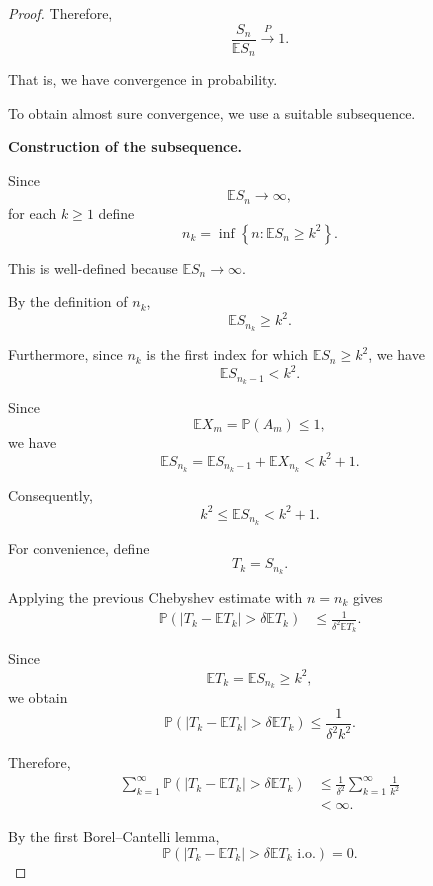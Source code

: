 \begin{proof}
Therefore,
\[
    \frac{S_n}{\mathbb E S_n}
    \xrightarrow{P}1.
\]

That is, we have convergence in probability.

To obtain almost sure convergence, we use a suitable subsequence.

\medskip

\noindent
\textbf{Construction of the subsequence.}

Since
\[
    \mathbb E S_n\longrightarrow\infty,
\]
for each $k\geq1$ define
\[
    n_k
    =
    \inf\left\{
        n:\mathbb E S_n\geq k^2
    \right\}.
\]

This is well-defined because $\mathbb E S_n\to\infty$.

By the definition of $n_k$,
\[
    \mathbb E S_{n_k}\geq k^2.
\]

Furthermore, since $n_k$ is the first index for which
$\mathbb E S_n\geq k^2$, we have
\[
    \mathbb E S_{n_k-1}<k^2.
\]

Since
\[
    \mathbb E X_m=\mathbb P(A_m)\leq1,
\]
we have
\[
    \mathbb E S_{n_k}
    =
    \mathbb E S_{n_k-1}
    +
    \mathbb E X_{n_k}
    <
    k^2+1.
\]

Consequently,
\[
    \boxed{
    k^2
    \leq
    \mathbb E S_{n_k}
    <
    k^2+1.
    }
\]

For convenience, define
\[
    T_k=S_{n_k}.
\]

Applying the previous Chebyshev estimate with $n=n_k$ gives
\[
\begin{aligned}
    \mathbb P\left(
        |T_k-\mathbb E T_k|
        >
        \delta\mathbb E T_k
    \right)
    &\leq
    \frac{1}
         {\delta^2\mathbb E T_k}.
\end{aligned}
\]

Since
\[
    \mathbb E T_k=\mathbb E S_{n_k}\geq k^2,
\]
we obtain
\[
    \boxed{
    \mathbb P\left(
        |T_k-\mathbb E T_k|
        >
        \delta\mathbb E T_k
    \right)
    \leq
    \frac{1}{\delta^2k^2}.
    }
\]

Therefore,
\[
\begin{aligned}
    \sum_{k=1}^{\infty}
    \mathbb P\left(
        |T_k-\mathbb E T_k|
        >
        \delta\mathbb E T_k
    \right)
    &\leq
    \frac{1}{\delta^2}
    \sum_{k=1}^{\infty}\frac1{k^2}
    \\
    &<\infty.
\end{aligned}
\]

By the first Borel--Cantelli lemma,
\[
    \mathbb P\left(
        |T_k-\mathbb E T_k|
        >
        \delta\mathbb E T_k
        \text{ i.o.}
    \right)=0.
\]


\end{proof}
